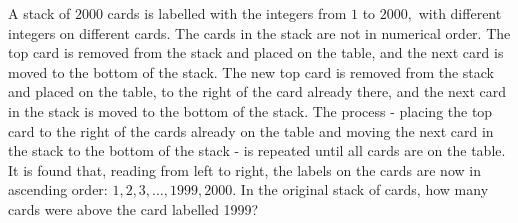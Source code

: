 A stack of $2000$ cards is labelled with the integers from $1$ to $2000,$ with different integers on different cards. The cards in the stack are not in numerical order. The top card is removed from the stack and placed on the table, and the next card is moved to the bottom of the stack. The new top card is removed from the stack and placed on the table, to the right of the card already there, and the next card in the stack is moved to the bottom of the stack. The process - placing the top card to the right of the cards already on the table and moving the next card in the stack to the bottom of the stack - is repeated until all cards are on the table. It is found that, reading from left to right, the labels on the cards are now in ascending order: $1,2,3,\ldots,1999,2000.$ In the original stack of cards, how many cards were above the card labelled 1999?